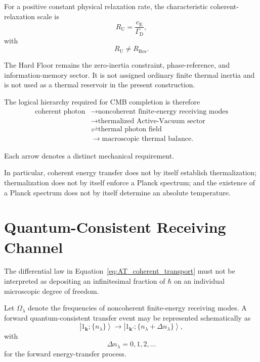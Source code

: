 For a positive constant physical relaxation rate, the characteristic
coherent-relaxation scale is
\begin{equation}
    R_{\mathrm U}
    =
    \frac{c_{\mathrm E}}{\Gamma_{\mathrm D}},
    \label{eq:AT_RU}
\end{equation}
with
\begin{equation}
    R_{\mathrm U}
    \neq
    R_{\mathrm{Res}}.
    \label{eq:AT_RU_RRes}
\end{equation}

The Hard Floor remains the zero-inertia constraint, phase-reference, and
information-memory sector. It is not assigned ordinary finite thermal
inertia and is not used as a thermal reservoir in the present construction.

The logical hierarchy required for CMB completion is therefore
\begin{equation}
    \begin{aligned}
        \text{coherent photon}
        &\longrightarrow
        \text{noncoherent finite-energy receiving modes}
        \\
        &\longrightarrow
        \text{thermalized Active-Vacuum sector}
        \\
        &\rightleftharpoons
        \text{thermal photon field}
        \\
        &\longrightarrow
        \text{macroscopic thermal balance}.
    \end{aligned}
    \label{eq:AT_hierarchy}
\end{equation}

Each arrow denotes a distinct mechanical requirement.

In particular, coherent energy transfer does not by itself establish
thermalization; thermalization does not by itself enforce a Planck spectrum;
and the existence of a Planck spectrum does not by itself determine an
absolute temperature.


\section{Quantum-Consistent Receiving Channel}

The differential law in
Equation~\eqref{eq:AT_coherent_transport}
must not be interpreted as depositing an infinitesimal fraction of
\(\hbar\)
on an individual microscopic degree of freedom.

Let
\(\Omega_\lambda\)
denote the frequencies of noncoherent finite-energy receiving modes.
A forward quantum-consistent transfer event may be represented schematically
as
\begin{equation}
    \left|
        1_{\mathbf k};
        \{n_\lambda\}
    \right\rangle
    \longrightarrow
    \left|
        1_{\mathbf k'};
        \{n_\lambda+\Delta n_\lambda\}
    \right\rangle,
    \label{eq:AT_quantized_transition}
\end{equation}
with
\begin{equation}
    \Delta n_\lambda
    =
    0,1,2,\ldots
\end{equation}
for the forward energy-transfer process.

